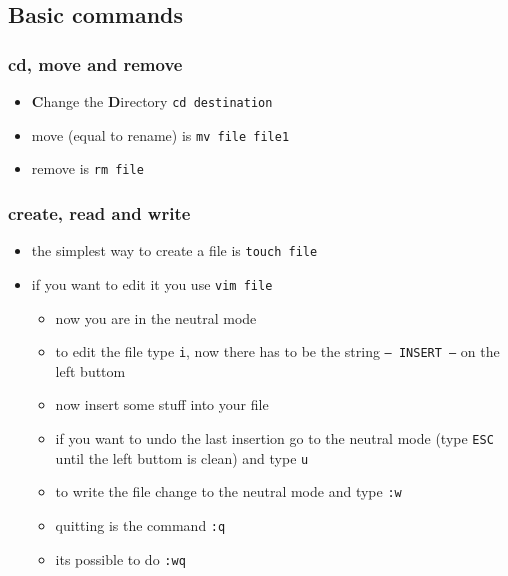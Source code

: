 \documentclass[handout]{beamer}
\newcommand{\code}[1]{\colorbox{lGray}{\texttt{#1}}}
\begin{document}
    \subsection{Basic commands}
        \begin{frame}
			\frametitle{cd, move and remove}
			\begin{itemize}
                \item<1-> \textbf{C}hange the \textbf{D}irectory \code{cd destination}
                \item<1-> move (equal to rename) is \code{mv file file1}
                \item<1-> remove is \code{rm file}
            \end{itemize}
		\end{frame}
        \begin{frame}
			\frametitle{create, read and write}
			\begin{itemize}
                \item<1-> the simplest way to create a file is \code{touch file}
                \item<2-> if you want to edit it you use \code{vim file}
                \begin{itemize}
                    \item<2-> now you are in the neutral mode
                    \item<3-> to edit the file type \code{i}, now there has to be the string \code{-- INSERT --} on the left buttom
                    \item<3-> now insert some stuff into your file
                    \item<4-> if you want to undo the last insertion go to the neutral mode (type \code{ESC} until the left buttom is clean) and type \code{u}
                    \item<5-> to write the file change to the neutral mode and type \code{:w}
                    \item<6-> quitting is the command \code{:q}
                    \item<6-> its possible to do \code{:wq}
                \end{itemize}
            \end{itemize}
		\end{frame}        
\end{document}
